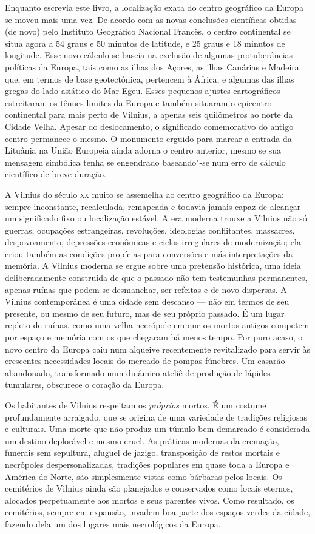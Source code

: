 Enquanto escrevia este livro, a localização exata do centro geográfico
da Europa se moveu mais uma vez. De acordo com as novas conclusões
científicas obtidas (de novo) pelo Instituto Geográfico Nacional
Francês, o centro continental se situa agora a 54 graus e 50 minutos de
latitude, e 25 graus e 18 minutos de longitude. Esse novo cálculo se
baseia na exclusão de algumas protuberâncias políticas da Europa, tais
como as ilhas dos Açores, as ilhas Canárias e Madeira que, em termos de
base geotectônica, pertencem à África, e algumas das ilhas gregas do
lado asiático do Mar Egeu. Esses pequenos ajustes cartográficos
estreitaram os tênues limites da Europa e também situaram o epicentro
continental para mais perto de Vilnius, a apenas seis quilômetros ao
norte da Cidade Velha. Apesar do deslocamento, o significado
comemorativo do antigo centro permanece o mesmo. O monumento erguido
para marcar a entrada da Lituânia na União Europeia ainda adorna o
centro anterior, mesmo se sua mensagem simbólica tenha se engendrado
baseando"-se num erro de cálculo científico de breve duração.

A Vilnius do século \textsc{xx} muito se assemelha ao centro geográfico da
Europa: sempre inconstante, recalculada, remapeada e todavia jamais
capaz de alcançar um significado fixo ou localização estável. A era
moderna trouxe a Vilnius não só guerras, ocupações estrangeiras,
revoluções, ideologias conflitantes, massacres, despovoamento,
depressões econômicas e ciclos irregulares de modernização; ela criou
também as condições propícias para conversões e más interpretações da
memória. A Vilnius moderna se ergue sobre uma pretensão histórica, uma
ideia deliberadamente construída de que o passado não tem testemunhas
permanentes, apenas ruínas que podem se desmanchar, ser refeitas e de
novo dispersas. A Vilnius contemporânea é uma cidade sem descanso --- não
em termos de seu presente, ou mesmo de seu futuro, mas de seu próprio
passado. É um lugar repleto de ruínas, como uma velha necrópole em que
os mortos antigos competem por espaço e memória com os que chegaram há
menos tempo. Por puro acaso, o novo centro da Europa caiu num alqueive
recentemente revitalizado para servir às crescentes necessidades locais
do mercado de pompas fúnebres. Um casarão abandonado, transformado num
dinâmico ateliê de produção de lápides tumulares, obscurece o coração da
Europa.

Os habitantes de Vilnius respeitam os \textit{próprios} mortos. É um
costume profundamente arraigado, que se origina de uma variedade de
tradições religiosas e culturais. Uma morte que não produz um túmulo bem
demarcado é considerada um destino deplorável e mesmo cruel. As práticas
modernas da cremação, funerais sem sepultura, aluguel de jazigo,
transposição de restos mortais e necrópoles despersonalizadas, tradições
populares em quase toda a Europa e América do Norte, são simplesmente
vistas como bárbaras pelos locais. Os cemitérios de Vilnius ainda são
planejados e conservados como locais eternos, alocados perpetuamente aos
mortos e seus parentes vivos. Como resultado, os cemitérios, sempre em
expansão, invadem boa parte dos espaços verdes da cidade, fazendo dela
um dos lugares mais necrológicos da Europa.

